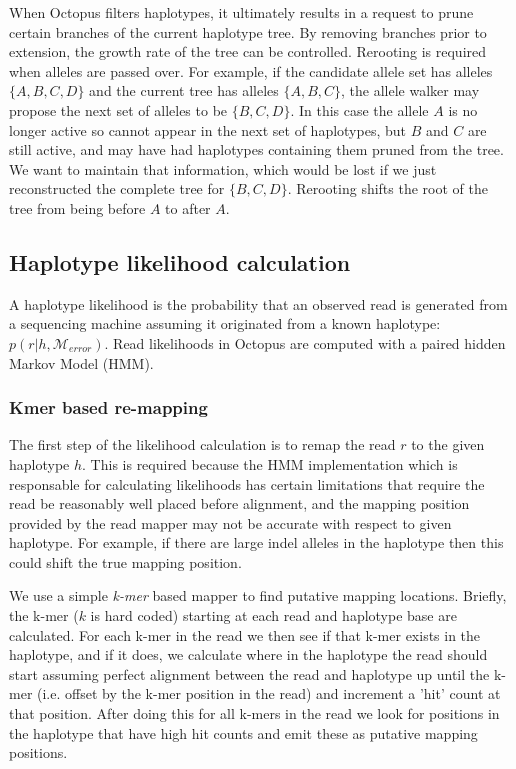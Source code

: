 \documentclass{article}
\begin{document}
When Octopus filters haplotypes, it ultimately results in a request to prune certain branches of the current haplotype tree. By removing branches prior to extension, the growth rate of the tree can be controlled. Rerooting is required when alleles are passed over. For example, if the candidate allele set has alleles $\{A, B, C, D\}$ and the current tree has alleles $\{A, B, C\}$, the allele walker may propose the next set of alleles to be $\{B, C, D\}$. In this case the allele $A$ is no longer active so cannot appear in the next set of haplotypes, but $B$ and $C$ are still active, and may have had haplotypes containing them pruned from the tree. We want to maintain that information, which would be lost if we just reconstructed the complete tree for $\{B, C, D\}$. Rerooting shifts the root of the tree from being before $A$ to after $A$.

\subsection{Haplotype likelihood calculation}\label{haplotype-likelihood}

A haplotype likelihood is the probability that an observed read is generated from a sequencing machine assuming it originated from a known haplotype: $p(r | h, \mathcal{M}_{error})$. Read likelihoods in Octopus are computed with a paired hidden Markov Model (HMM).

\subsubsection{Kmer based re-mapping}\label{hmm:mapping}

The first step of the likelihood calculation is to remap the read $r$ to the given haplotype $h$. This is required because the HMM implementation which is responsable for calculating likelihoods has certain limitations that require the read be reasonably well placed before alignment, and the mapping position provided by the read mapper may not be accurate with respect to given haplotype. For example, if there are large indel alleles in the haplotype then this could shift the true mapping position.

We use a simple \emph{k-mer} based mapper to find putative mapping locations. Briefly, the k-mer ($k$ is hard coded) starting at each read and haplotype base are calculated. For each k-mer in the read we then see if that k-mer exists in the haplotype, and if it does, we calculate where in the haplotype the read should start assuming perfect alignment between the read and haplotype up until the k-mer (i.e. offset by the k-mer position in the read) and increment a 'hit' count at that position. After doing this for all k-mers in the read we look for positions in the haplotype that have high hit counts and emit these as putative mapping positions.
\end{document}
